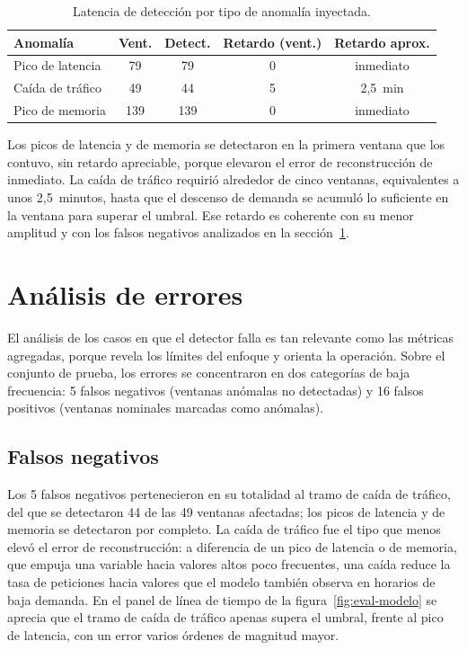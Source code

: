 \begin{table}[H]
\centering
\small
\caption{Latencia de detección por tipo de anomalía inyectada.}
\label{tab:latencia-deteccion}
\begin{tabular}{@{}>{\raggedright\arraybackslash}p{}cccc@{}}
\toprule
\textbf{Anomalía} & \textbf{Vent.} & \textbf{Detect.} & \textbf{Retardo (vent.)} & \textbf{Retardo aprox.} \\
\midrule
Pico de latencia & 79 & 79 & 0 & inmediato \\
Caída de tráfico & 49 & 44 & 5 & 2,5~min \\
Pico de memoria & 139 & 139 & 0 & inmediato \\
\bottomrule
\end{tabular}
\end{table}

Los picos de latencia y de memoria se detectaron en la primera ventana que los contuvo, sin retardo apreciable, porque elevaron el error de reconstrucción de inmediato. La caída de tráfico requirió alrededor de cinco ventanas, equivalentes a unos 2,5~minutos, hasta que el descenso de demanda se acumuló lo suficiente en la ventana para superar el umbral. Ese retardo es coherente con su menor amplitud y con los falsos negativos analizados en la sección~\ref{sec:analisis-errores}.


\section{Análisis de errores}
\label{sec:analisis-errores}

El análisis de los casos en que el detector falla es tan relevante como las métricas agregadas, porque revela los límites del enfoque y orienta la operación. Sobre el conjunto de prueba, los errores se concentraron en dos categorías de baja frecuencia: 5 falsos negativos (ventanas anómalas no detectadas) y 16 falsos positivos (ventanas nominales marcadas como anómalas).

\subsection{Falsos negativos}

Los 5 falsos negativos pertenecieron en su totalidad al tramo de caída de tráfico, del que se detectaron 44 de las 49 ventanas afectadas; los picos de latencia y de memoria se detectaron por completo. La caída de tráfico fue el tipo que menos elevó el error de reconstrucción: a diferencia de un pico de latencia o de memoria, que empuja una variable hacia valores altos poco frecuentes, una caída reduce la tasa de peticiones hacia valores que el modelo también observa en horarios de baja demanda. En el panel de línea de tiempo de la figura~\ref{fig:eval-modelo} se aprecia que el tramo de caída de tráfico apenas supera el umbral, frente al pico de latencia, con un error varios órdenes de magnitud mayor.

